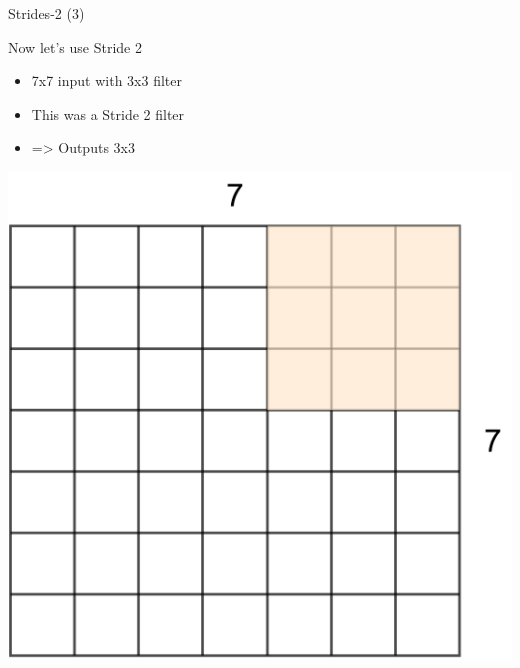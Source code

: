 \documentclass[default, aspectratio=169]{beamer}
\begin{document}
	\begin{frame}{Strides-2 (3)}
		\vspace{0.5cm}
		
		\normalsize Now let's use Stride 2
		\begin{itemize}
			\item 7x7 input with 3x3 filter
			\item This was a Stride 2 filter
			\item=> Outputs 3x3
		\end{itemize}
		
		\centering
		\includegraphics[keepaspectratio, scale=0.25]{pic/Stride8.png}
	\end{frame}
	
\end{document}
